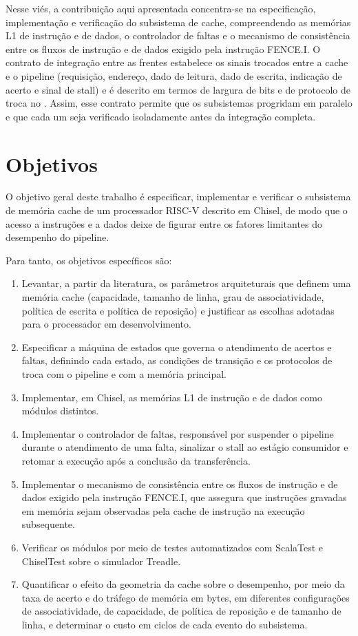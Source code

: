 Nesse viés, a contribuição aqui apresentada concentra-se na especificação, implementação e verificação do subsistema de cache, compreendendo as memórias L1 de instrução e de dados, o controlador de faltas e o mecanismo de consistência entre os fluxos de instrução e de dados exigido pela instrução FENCE.I. O contrato de integração entre as frentes estabelece os sinais trocados entre a cache e o pipeline (requisição, endereço, dado de leitura, dado de escrita, indicação de acerto e sinal de stall) e é descrito em termos de largura de bits e de protocolo de troca no . Assim, esse contrato permite que os subsistemas progridam em paralelo e que cada um seja verificado isoladamente antes da integração completa.

\section{Objetivos}\label{sec:1.3}

O objetivo geral deste trabalho é especificar, implementar e verificar o subsistema de memória cache de um processador RISC-V descrito em Chisel, de modo que o acesso a instruções e a dados deixe de figurar entre os fatores limitantes do desempenho do pipeline.

Para tanto, os objetivos específicos são:

\begin{enumerate}
\def\labelenumi{\arabic{enumi}.}
\item
  Levantar, a partir da literatura, os parâmetros arquiteturais que definem uma memória cache (capacidade, tamanho de linha, grau de associatividade, política de escrita e política de reposição) e justificar as escolhas adotadas para o processador em desenvolvimento.
\item
  Especificar a máquina de estados que governa o atendimento de acertos e faltas, definindo cada estado, as condições de transição e os protocolos de troca com o pipeline e com a memória principal.
\item
  Implementar, em Chisel, as memórias L1 de instrução e de dados como módulos distintos.
\item
  Implementar o controlador de faltas, responsável por suspender o pipeline durante o atendimento de uma falta, sinalizar o stall ao estágio consumidor e retomar a execução após a conclusão da transferência.
\item
  Implementar o mecanismo de consistência entre os fluxos de instrução e de dados exigido pela instrução FENCE.I, que assegura que instruções gravadas em memória sejam observadas pela cache de instrução na execução subsequente.
\item
  Verificar os módulos por meio de testes automatizados com ScalaTest e ChiselTest sobre o simulador Treadle.
\item
  Quantificar o efeito da geometria da cache sobre o desempenho, por meio da taxa de acerto e do tráfego de memória em bytes, em diferentes configurações de associatividade, de capacidade, de política de reposição e de tamanho de linha, e determinar o custo em ciclos de cada evento do subsistema.
\end{enumerate}

